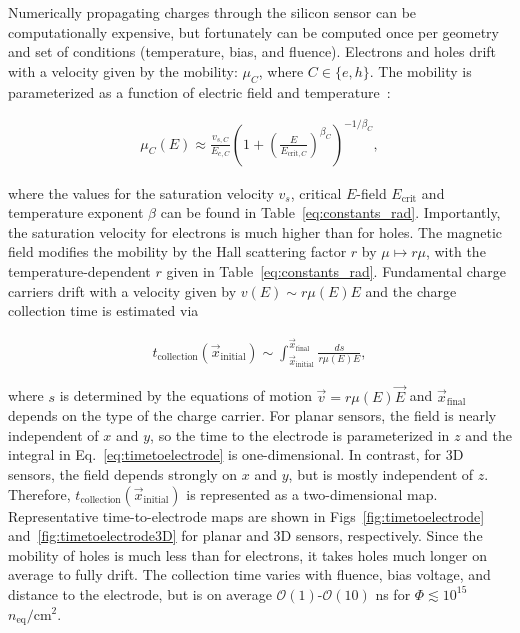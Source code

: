 Numerically propagating charges through the silicon sensor can be computationally expensive, but fortunately can be computed once per geometry and set of conditions (temperature, bias, and fluence).   Electrons and holes drift with a velocity given by the mobility: $\mu_C$, where $C\in\{e,h\}$.  The mobility is parameterized as a function of electric field and temperature~\cite{JACOBONI197777}:

\begin{align}
\label{eq:mobility}
\mu_{C}(E)\approx \frac{v_{s,C}}{E_{c,C}}\left(1+\left(\frac{E}{E_{\text{crit},C}}\right)^{\beta_C}\right)^{-1/{\beta_C}},
\end{align}

\noindent where the values for the saturation velocity $v_s$, critical $E$-field $E_\text{crit}$ and temperature exponent $\beta$ can be found in Table~\ref{eq:constants_rad}.  Importantly, the saturation velocity for electrons is much higher than for holes.  The magnetic field modifies the mobility by the Hall scattering factor $r$ by $\mu\mapsto r\mu$, with the temperature-dependent $r$ given in Table~\ref{eq:constants_rad}.  Fundamental charge carriers drift with a velocity given by $v(E)\sim r\mu(E)E$ and the charge collection time is estimated via

\begin{align}
\label{eq:timetoelectrode}
t_\text{collection}(\vec{x}_\text{initial})\sim\int_\text{$\vec{x}_\text{initial}$}^\text{$\vec{x}_\text{final}$}\frac{ds}{r\mu(E)E},
\end{align}

where $s$ is determined by the equations of motion $\vec{v}=r\mu(E)\vec{E}$ and $\vec{x}_\text{final}$ depends on the type of the charge carrier.  For planar sensors, the field is nearly independent of $x$ and $y$, so the time to the electrode is parameterized in $z$ and the integral in Eq.~\ref{eq:timetoelectrode} is one-dimensional.  In contrast, for 3D sensors, the field depends strongly on $x$ and $y$, but is mostly independent of $z$.  Therefore, $t_\text{collection}(\vec{x}_\text{initial})$ is represented as a two-dimensional map.  Representative time-to-electrode maps are shown in Figs~\ref{fig:timetoelectrode} and~\ref{fig:timetoelectrode3D} for planar and 3D sensors, respectively.  Since the mobility of holes is much less than for electrons, it takes holes much longer on average to fully drift.  The collection time varies with fluence, bias voltage, and distance to the electrode, but is on average $\mathcal{O}(1)$-$\mathcal{O}(10)$ ns for $\Phi\lesssim 10^{15}$ $n_\text{eq}/\text{cm}^2$.


